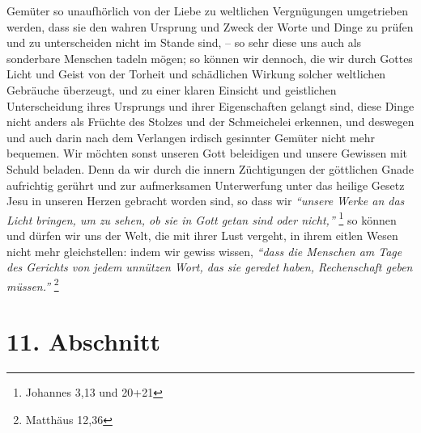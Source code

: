 Gemüter so unaufhörlich von der Liebe zu weltlichen Vergnügungen umgetrieben
werden, dass sie den wahren Ursprung und Zweck der Worte und Dinge zu prüfen und
zu unterscheiden nicht im Stande sind, -- so sehr diese uns auch als sonderbare
Menschen tadeln mögen; so können wir dennoch, die wir durch Gottes Licht und
Geist von der Torheit und schädlichen Wirkung solcher weltlichen Gebräuche
überzeugt, und zu einer klaren Einsicht und geistlichen Unterscheidung ihres
Ursprungs und ihrer Eigenschaften gelangt sind, diese Dinge nicht anders als
Früchte des Stolzes und der Schmeichelei erkennen, und deswegen und auch darin
nach dem Verlangen irdisch gesinnter Gemüter nicht mehr bequemen. Wir möchten
sonst unseren Gott beleidigen und unsere Gewissen mit Schuld beladen. Denn da wir
durch die innern Züchtigungen der göttlichen Gnade
aufrichtig gerührt und zur
aufmerksamen Unterwerfung unter das heilige Gesetz Jesu in unseren
Herzen
gebracht worden sind, so dass wir
\textit{"`unsere Werke an das Licht bringen, um zu
sehen, ob sie in Gott getan sind oder nicht,"'}
\footnote{Johannes 3,13 und 20+21}
so können und dürfen wir uns der Welt, die mit ihrer Lust vergeht, in ihrem
eitlen
Wesen nicht mehr gleichstellen: indem wir gewiss wissen,
\textit{"`dass die Menschen am
Tage des Gerichts von jedem unnützen Wort, das sie geredet haben, Rechenschaft
geben müssen."'}
\footnote{Matthäus 12,36}

\section{11. Abschnitt} \label{kap10_ab11}

